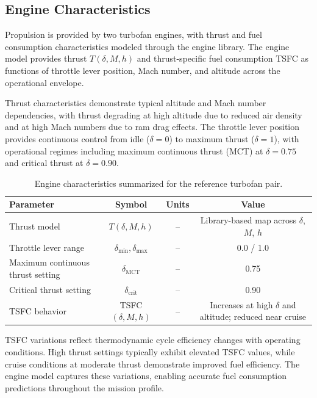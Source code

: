 \subsection{Engine Characteristics}

Propulsion is provided by two turbofan engines, with thrust and fuel consumption characteristics modeled through the engine library. The engine model provides thrust $T(\delta, M, h)$ and thrust-specific fuel consumption TSFC as functions of throttle lever position, Mach number, and altitude across the operational envelope.

Thrust characteristics demonstrate typical altitude and Mach number dependencies, with thrust degrading at high altitude due to reduced air density and at high Mach numbers due to ram drag effects. The throttle lever position provides continuous control from idle ($\delta = 0$) to maximum thrust ($\delta = 1$), with operational regimes including maximum continuous thrust (MCT) at $\delta = 0.75$ and critical thrust at $\delta = 0.90$.

\begin{table}[h]
    \centering
    \footnotesize
    \caption{Engine characteristics summarized for the reference turbofan pair.}
    \begin{tabular}{l c c c}
        \hline
        Parameter & Symbol & Units & Value \\
        \hline
        Thrust model & $T(\delta, M, h)$ & -- & Library-based map across $\delta$, $M$, $h$ \\
        Throttle lever range & $\delta_{\min},\delta_{\max}$ & -- & 0.0 / 1.0 \\
        Maximum continuous thrust setting & $\delta_{\mathrm{MCT}}$ & -- & 0.75 \\
        Critical thrust setting & $\delta_{\mathrm{crit}}$ & -- & 0.90 \\
        TSFC behavior & TSFC$(\delta, M, h)$ & -- & Increases at high $\delta$ and altitude; reduced near cruise \\
        \hline
    \end{tabular}
\end{table}

TSFC variations reflect thermodynamic cycle efficiency changes with operating conditions. High thrust settings typically exhibit elevated TSFC values, while cruise conditions at moderate thrust demonstrate improved fuel efficiency. The engine model captures these variations, enabling accurate fuel consumption predictions throughout the mission profile.

